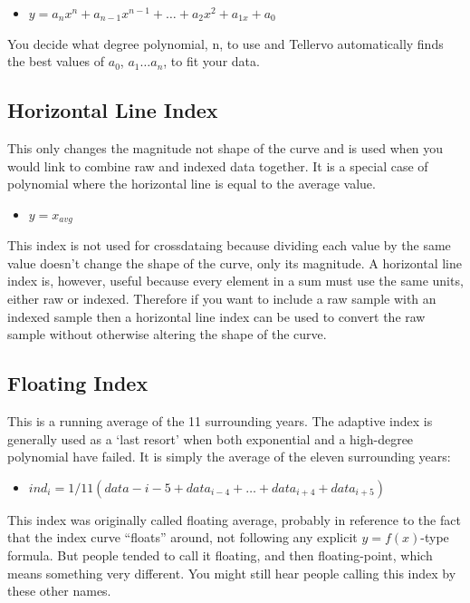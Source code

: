 \begin{itemize}
\item $y = a_{n}x^{n} + a_{n-1}x^{n-1} + \dots + a_{2}x^{2} + a_{1x} + a_{0}$ 
\end{itemize}

You decide what degree polynomial, n, to use and Tellervo automatically finds the best values of $a_{0}$, $a_{1} \dots a_{n}$, to fit your data. 

\subsection{Horizontal Line Index}
This only changes the magnitude not shape of the curve and is used when you would link to combine raw and indexed data together.  It is a special case of polynomial where the horizontal line is equal to the average value. 

\begin{itemize}
\item $y = x_{avg}$
\end{itemize}

This index is not used for crossdataing because dividing each value by the same value doesn't change the shape of the curve, only its magnitude. A horizontal line index is, however, useful because every element in a sum must use the same units, either raw or indexed. Therefore if you want to include a raw sample with an indexed sample then a horizontal line index can be used to convert the raw sample without otherwise altering the shape of the curve. 

\subsection{Floating Index}
This is a running average of the 11 surrounding years. The adaptive index is generally used as a `last resort' when both exponential and a high-degree polynomial have failed. It is simply the average of the eleven surrounding years:

\begin{itemize}
\item $ind_{i} = 1/11 (data-{i-5} + data_{i-4} + \dots + data_{i+4} + data_{i+5})$ 
\end{itemize}

This index was originally called floating average, probably in reference to the fact that the index curve ``floats'' around, not following any explicit $y=f(x)$-type formula. But people tended to call it floating, and then floating-point, which means something very different. You might still hear people calling this index by these other names.

